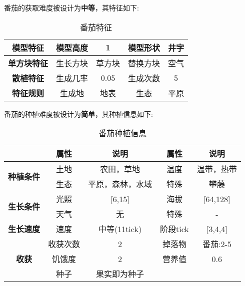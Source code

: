 番茄的获取难度被设计为\textbf{中等}，其特征如下:
\begin{table}[H]
    \centering
    \caption{番茄特征}
    \label{table:番茄特征}
    \setlength{\tabcolsep}{4mm}
    \begin{tabular}{c|cc|cc}
        \toprule
        \textbf{模型特征}   & 模型高度 & 1      & 模型形状 & 井字 \\
        \midrule
        \textbf{单方块特征} & 生长方块 & 草方块 & 替换方块 & 空气 \\
        \midrule
        \textbf{散植特征}   & 生成几率 & 0.05   & 生成次数 & 5    \\
        \midrule
        \textbf{特征规则}   & 生成地   & 地表   & 生态     & 平原 \\
        \bottomrule
    \end{tabular}
\end{table}


番茄的种植难度被设计为\textbf{简单}，其种植信息如下:

\begin{table}[H]
    \centering
    \caption{番茄种植信息}
    \label{table:番茄种植信息}
    \setlength{\tabcolsep}{4mm}
    \begin{tabular}{c|cc|cc}
        \toprule
                                           & \textbf{属性} & \textbf{说明}    & \textbf{属性} & \textbf{说明} \\
        \midrule
        \multirow{2}{*}{\textbf{种植条件}} & 土地          & 农田，草地       & 温度          & 温带，热带    \\
                                           & 生态          & 平原，森林，水域 & 特殊          & 攀藤          \\
        \midrule
        \multirow{2}{*}{\textbf{生长条件}} & 光照          & [6,15]           & 海拔          & [64,128]      \\
                                           & 天气          & 无               & 特殊          & -             \\
        \midrule
        \textbf{生长速度}                  & 速度          & 中等(11tick)     & 阶段tick      & [3,4,4]       \\
        \midrule
        \multirow{3}{*}{\textbf{收获}}     & 收获次数      & 2                & 掉落物        & 番茄:2-5      \\
                                           & 饥饿度        & 2                & 营养值        & 0.6           \\
                                        & 种子 & 果实即为种子 \\
        \bottomrule
    \end{tabular}
\end{table}

